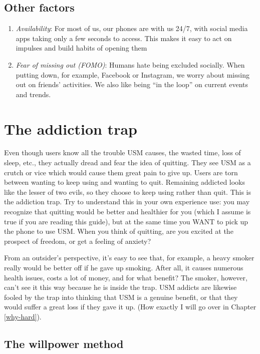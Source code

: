 \documentclass[
]{book}
\providecommand{\tightlist}{%
  \setlength{\itemsep}{0pt}\setlength{\parskip}{0pt}}
\begin{document}
\section{Other factors}\label{other-factors}

\begin{enumerate}
\def\labelenumi{\arabic{enumi}.}
\tightlist
\item
  \emph{Availability}: For most of us, our phones are with us 24/7, with social media apps taking only a few seconds to access. This makes it easy to act on impulses and build habits of opening them
\item
  \emph{Fear of missing out (FOMO)}: Humans hate being excluded socially. When putting down, for example, Facebook or Instagram, we worry about missing out on friends' activities. We also like being ``in the loop'' on current events and trends.
\end{enumerate}

\chapter{The addiction trap}\label{the-addiction-trap}

Even though users know all the trouble USM causes, the wasted time, loss of sleep, etc., they actually dread and fear the idea of quitting. They see USM as a crutch or vice which would cause them great pain to give up. Users are torn between wanting to keep using and wanting to quit. Remaining addicted looks like the lesser of two evils, so they choose to keep using rather than quit. This is the addiction trap. Try to understand this in your own experience use: you may recognize that quitting would be better and healthier for you (which I assume is true if you are reading this guide), but at the same time you WANT to pick up the phone to use USM. When you think of quitting, are you excited at the prospect of freedom, or get a feeling of anxiety?

From an outsider's perspective, it's easy to see that, for example, a heavy smoker really would be better off if he gave up smoking. After all, it causes numerous health issues, costs a lot of money, and for what benefit? The smoker, however, can't see it this way because he is inside the trap. USM addicts are likewise fooled by the trap into thinking that USM is a genuine benefit, or that they would suffer a great loss if they gave it up. (How exactly I will go over in Chapter \ref{why-hard}).

\section{The willpower method}\label{the-willpower-method}
\end{document}
